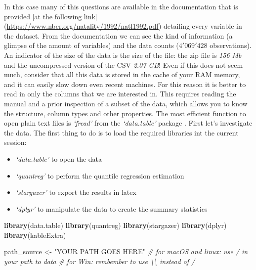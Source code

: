 \documentclass[]{book}
\newenvironment{Shaded}{\begin{snugshade}}{\end{snugshade}}
\newcommand{\KeywordTok}[1]{\textcolor[rgb]{0.13,0.29,0.53}{\textbf{#1}}}
\newcommand{\StringTok}[1]{\textcolor[rgb]{0.31,0.60,0.02}{#1}}
\newcommand{\CommentTok}[1]{\textcolor[rgb]{0.56,0.35,0.01}{\textit{#1}}}
\newcommand{\NormalTok}[1]{#1}
\providecommand{\tightlist}{%
  \setlength{\itemsep}{0pt}\setlength{\parskip}{0pt}}
\begin{document}
In this case many of this questions are available in the documentation
that is provided {[}at the following link{]}
(\url{https://www.nber.org/natality/1992/natl1992.pdf}) detailing every
variable in the dataset. From the documentation we can see the kind of
information (a glimpse of the amount of variables) and the data counts
(\(4'069'428\) observations). An indicator of the size of the data is
the size of the file: the zip file is \emph{156 Mb} and the uncompressed
version of the CSV \emph{2.07 GB}! Even if this does not seem much,
consider that all this data is stored in the cache of your RAM memory,
and it can easily slow down even recent machines. For this reason it is
better to read in only the columns that we are interested in. This
requires reading the manual and a prior inspection of a subset of the
data, which allows you to know the structure, column types and other
properties. The most efficient function to open plain text files is
\emph{`fread'} from the \emph{`data.table'} package
\citep{R-data.table}. First let's investigate the data. The first thing
to do is to load the required libraries int the current session:

\begin{itemize}
\tightlist
\item
  \emph{`data.table'} to open the data
\item
  \emph{`quantreg'} to perform the quantile regression estimation
\item
  \emph{`stargazer'} to export the results in latex
\item
  \emph{`dplyr'} to manipulate the data to create the summary statistics
\end{itemize}

\begin{Shaded}
\begin{Highlighting}[]
\KeywordTok{library}\NormalTok{(data.table)}
\KeywordTok{library}\NormalTok{(quantreg)}
\KeywordTok{library}\NormalTok{(stargazer)}
\KeywordTok{library}\NormalTok{(dplyr)}
\KeywordTok{library}\NormalTok{(kableExtra)}
\end{Highlighting}
\end{Shaded}

\begin{Shaded}
\begin{Highlighting}[]
\NormalTok{path_source <-}\StringTok{ "YOUR PATH GOES HERE"}
\CommentTok{# for macOS and linux: use / in your path to data}
\CommentTok{# for Win: rembember to use \textbackslash{}\textbackslash{} instead of /}
\end{Highlighting}
\end{Shaded}
\end{document}
